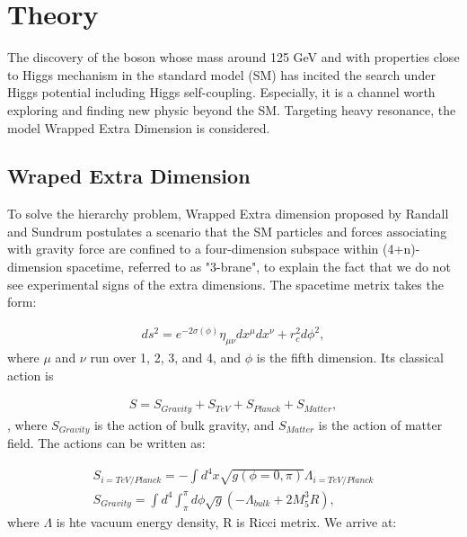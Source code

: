 \section{Theory}

The discovery of the boson whose mass around 125 GeV and with properties close to Higgs mechanism in the standard model (SM) has incited the search under Higgs potential including Higgs self-coupling\citep{jetarea_fastjet_pu,HiggsdiscoveryAtlas}. Especially, it is a channel worth exploring and finding new physic beyond the SM. 
Targeting heavy resonance, the model Wrapped Extra Dimension is considered. 

\subsection{Wraped Extra Dimension} 

To solve the hierarchy problem, Wrapped Extra dimension proposed by Randall and Sundrum postulates a scenario that the SM particles and forces associating with gravity force are confined to a four-dimension subspace within (4+n)-dimension spacetime, referred to as "3-brane", 
to explain the fact that we do not see experimental signs of the extra dimensions\citep{Randall:1999ee}.  The spacetime metrix takes the form\citep{Oliveira:2014kla}:

\begin{equation} \label{eq1}
\begin{split}
ds^2 = e^{-2\sigma(\phi)}\eta_{\mu\nu}dx^{\mu}dx^{\nu} + r^2_{c}d\phi^2, 
\end{split}
\end{equation}
where $\mu$ and $\nu$ run over 1, 2, 3, and 4, and $\phi$ is the fifth dimension. Its classical action is 

\begin{equation} \label{eq1}
\begin{split}
S = S_{Gravity}+S_{TeV}+S_{Planck}+S_{Matter},
\end{split}
\end{equation},
where $S_{Gravity}$ is the action of bulk gravity, and $S_{Matter}$ is the action of matter field. The actions can be written as:

\begin{equation} \label{eq1}
\begin{split}
S_{i=TeV/Planck}=-\int d^4x \sqrt{g(\phi =0,\pi)}\Lambda_{i=TeV/Planck}\\
S_{Gravity}=\int d^4 \int ^{\pi}_{\pi} d\phi \sqrt{g}(-\Lambda_{bulk}+2M^3_{5}R),
\end{split}
\end{equation}
where $\Lambda$ is hte vacuum energy density, R is Ricci metrix. We arrive at:

